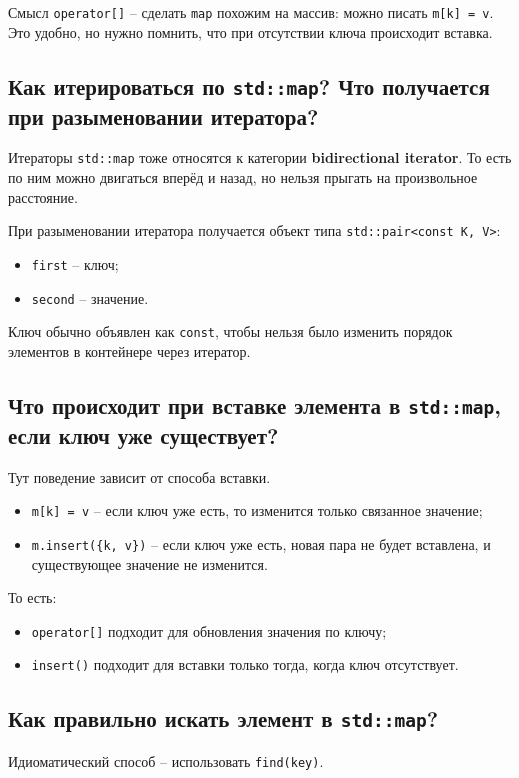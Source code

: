 Смысл \texttt{operator[]} -- сделать \texttt{map} похожим на массив: можно писать \texttt{m[k] = v}. Это удобно, но нужно помнить, что при отсутствии ключа происходит вставка.

\subsection{Как итерироваться по \texttt{std::map}? Что получается при разыменовании итератора?}
Итераторы \texttt{std::map} тоже относятся к категории \textbf{bidirectional iterator}. То есть по ним можно двигаться вперёд и назад, но нельзя прыгать на произвольное расстояние.

При разыменовании итератора получается объект типа \texttt{std::pair<const K, V>}:
\begin{itemize}
    \item \texttt{first} -- ключ;
    \item \texttt{second} -- значение.
\end{itemize}

Ключ обычно объявлен как \texttt{const}, чтобы нельзя было изменить порядок элементов в контейнере через итератор.

\subsection{Что происходит при вставке элемента в \texttt{std::map}, если ключ уже существует?}
Тут поведение зависит от способа вставки.

\begin{itemize}
    \item \texttt{m[k] = v} -- если ключ уже есть, то изменится только связанное значение;
    \item \texttt{m.insert(\{k, v\})} -- если ключ уже есть, новая пара не будет вставлена, и существующее значение не изменится.
\end{itemize}

То есть:
\begin{itemize}
    \item \texttt{operator[]} подходит для обновления значения по ключу;
    \item \texttt{insert()} подходит для вставки только тогда, когда ключ отсутствует.
\end{itemize}

\subsection{Как правильно искать элемент в \texttt{std::map}?}
Идиоматический способ -- использовать \texttt{find(key)}.

